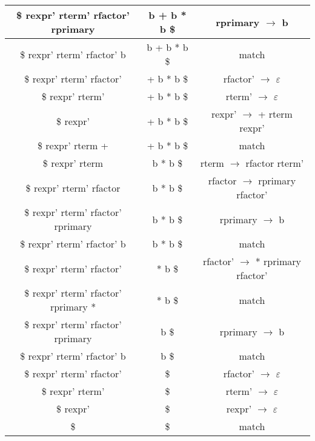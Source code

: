 \documentclass[UTF8]{report}
\begin{document}
\begin{enumerate}[label=(\arabic*)]
\begin{table}[H]
\begin{tabular}{|c|c|c|}
            \hline
            \$ rexpr' rterm' rfactor' rprimary & b + b * b \$ & rprimary $\to$ b \\
            \hline
            \$ rexpr' rterm' rfactor' b & b + b * b \$ & match \\
            \hline
            \$ rexpr' rterm' rfactor' & + b * b \$ & rfactor' $\to$ $\varepsilon$ \\
            \hline
            \$ rexpr' rterm' & + b * b \$ & rterm' $\to$ $\varepsilon$ \\
            \hline
            \$ rexpr' & + b * b \$ & rexpr' $\to$ + rterm rexpr' \\
            \hline
            \$ rexpr' rterm + & + b * b \$ & match \\
            \hline
            \$ rexpr' rterm & b * b \$ & rterm $\to$ rfactor rterm' \\
            \hline
            \$ rexpr' rterm' rfactor & b * b \$ & rfactor $\to$ rprimary rfactor' \\
            \hline
            \$ rexpr' rterm' rfactor' rprimary & b * b \$ & rprimary $\to$ b \\
            \hline
            \$ rexpr' rterm' rfactor' b & b * b \$ & match \\
            \hline
            \$ rexpr' rterm' rfactor' & * b \$ & rfactor' $\to$ * rprimary rfactor' \\
            \hline
            \$ rexpr' rterm' rfactor' rprimary * & * b \$ & match \\
            \hline
            \$ rexpr' rterm' rfactor' rprimary & b \$ & rprimary $\to$ b \\
            \hline
            \$ rexpr' rterm' rfactor' b & b \$ & match \\
            \hline
            \$ rexpr' rterm' rfactor' & \$ & rfactor' $\to$ $\varepsilon$ \\
            \hline
            \$ rexpr' rterm' & \$ & rterm' $\to$ $\varepsilon$ \\
            \hline
            \$ rexpr' & \$ & rexpr' $\to$ $\varepsilon$ \\
            \hline
            \$ & \$ & match \\
            \hline
        \end{tabular}
    \end{table}
\end{enumerate}
\end{document}
